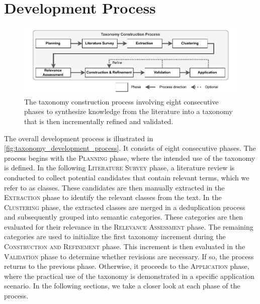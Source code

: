 
\section{Development Process}
\label{sec:taxonomy_development_process}

\begin{figure}[t]
    \centering
    \includegraphics[width=0.99\linewidth]{figures/question_catalog/taxonomy-construction_process_general.drawio.pdf}
    \caption[Taxonomy Construction Process]{The taxonomy construction process involving eight consecutive phases to synthesize knowledge from the literature into a taxonomy that is then incrementally refined and validated.}
    \label{fig:taxonomy_development_process}
\end{figure}

The overall development process is illustrated in \autoref{fig:taxonomy_development_process}. It consists of eight consecutive phases. The process begins with the \textsc{Planning} phase, where the intended use of the taxonomy is defined. In the following \textsc{Literature Survey} phase, a literature review is conducted to collect potential candidates that contain relevant terms, which we refer to as classes. These candidates are then manually extracted in the \textsc{Extraction} phase to identify the relevant classes from the text. In the \textsc{Clustering} phase, the extracted classes are merged in a deduplication process and subsequently grouped into semantic categories. These categories are then evaluated for their relevance in the \textsc{Relevance Assessment} phase. The remaining categories are used to initialize the first taxonomy increment during the \textsc{Construction and Refinement} phase. This increment is then evaluated in the \textsc{Validation} phase to determine whether revisions are necessary. If so, the process returns to the previous phase. Otherwise, it proceeds to the \textsc{Application} phase, where the practical use of the taxonomy is demonstrated in a specific application scenario. In the following sections, we take a closer look at each phase of the process.


